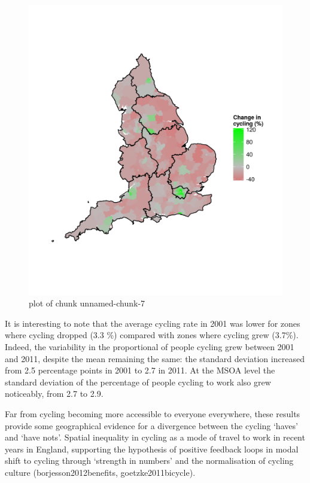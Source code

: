 \begin{figure}[htbp]
\centering
\includegraphics{figure/unnamed-chunk-7.png}
\caption{plot of chunk unnamed-chunk-7}
\end{figure}

It is interesting to note that the average cycling rate in 2001 was
lower for zones where cycling dropped (3.3 \%) compared with zones where
cycling grew (3.7\%). Indeed, the variability in the proportional of
people cycling grew between 2001 and 2011, despite the mean remaining
the same: the standard deviation increased from 2.5 percentage points in
2001 to 2.7 in 2011. At the MSOA level the standard deviation of the
percentage of people cycling to work also grew noticeably, from 2.7 to
2.9.

Far from cycling becoming more accessible to everyone everywhere, these
results provide some geographical evidence for a divergence between the
cycling `haves' and `have nots'. Spatial inequality in cycling as a mode
of travel to work in recent years in England, supporting the hypothesis
of positive feedback loops in modal shift to cycling through `strength
in numbers' and the normalisation of cycling culture
(borjesson2012benefits, goetzke2011bicycle).

